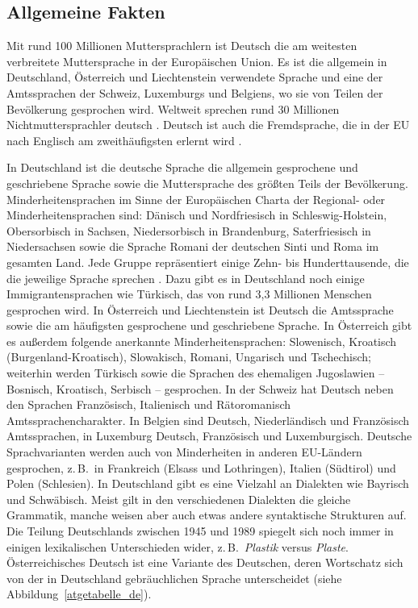 \documentclass[]{../../metanetpaper}
\begin{document}
\begin{multicols}{2}

\subsection{Allgemeine Fakten}

Mit rund 100 Millionen Muttersprachlern ist Deutsch die am weitesten verbreitete Muttersprache in der Europäischen Union. Es ist die allgemein in Deutschland, Österreich und Liechtenstein verwendete Sprache und eine der Amtssprachen der Schweiz, Luxemburgs und Belgiens, wo sie von Teilen der Bevölkerung gesprochen wird. Weltweit sprechen rund 30 Millionen Nichtmuttersprachler deutsch \cite{Eur1}. Deutsch ist auch die Fremdsprache, die in der EU nach Englisch am zweithäufigsten erlernt wird \cite{Goe1}.  

In Deutschland ist die deutsche Sprache die allgemein gesprochene und geschriebene Sprache sowie die Muttersprache des größten Teils der Bevölkerung. Minderheitensprachen im Sinne der Europäischen Charta der Regional- oder Minderheitensprachen sind: Dänisch und Nordfriesisch in Schleswig-Holstein, Obersorbisch in Sachsen, Niedersorbisch in Brandenburg, Saterfriesisch in Niedersachsen sowie die Sprache Romani der deutschen Sinti und Roma im gesamten Land. Jede Gruppe repräsentiert einige Zehn- bis Hunderttausende, die die jeweilige Sprache sprechen \cite{Efni1}. Dazu gibt es in Deutschland noch einige Immigrantensprachen wie Türkisch, das von rund 3,3 Millionen Menschen gesprochen wird.  In Österreich und Liechtenstein ist Deutsch die Amtssprache sowie die am häufigsten gesprochene und geschriebene Sprache. In Österreich gibt es außerdem folgende anerkannte Minderheitensprachen: Slowenisch, Kroatisch (Burgenland-Kroatisch), Slowakisch, Romani, Ungarisch und Tschechisch; weiterhin werden Türkisch sowie die Sprachen des ehemaligen Jugoslawien -- Bosnisch, Kroatisch, Serbisch -- gesprochen.  In der Schweiz hat Deutsch neben den Sprachen Französisch, Italienisch und Rätoromanisch Amtssprachencharakter. In Belgien sind Deutsch, Niederländisch und Französisch Amtssprachen, in Luxemburg Deutsch, Französisch und Luxemburgisch. Deutsche Sprachvarianten werden auch von Minderheiten in anderen EU-Ländern gesprochen, z.\,B.~in Frankreich (Elsass und Lothringen), Italien (Südtirol) und Polen (Schlesien).  In Deutschland gibt es eine Vielzahl an Dialekten wie Bayrisch und Schwäbisch. Meist gilt in den verschiedenen Dialekten die gleiche Grammatik, manche weisen aber auch etwas andere syntaktische Strukturen auf. Die Teilung Deutschlands zwischen 1945 und 1989 spiegelt sich noch immer in einigen lexikalischen Unterschieden wider, z.\,B.~\textit{Plastik} versus \textit{Plaste}. Österreichisches Deutsch ist eine Variante des Deutschen, deren Wortschatz sich von der in Deutschland gebräuchlichen Sprache unterscheidet (siehe Abbildung~\ref{atgetabelle_de}).


\end{multicols}
\end{document}
